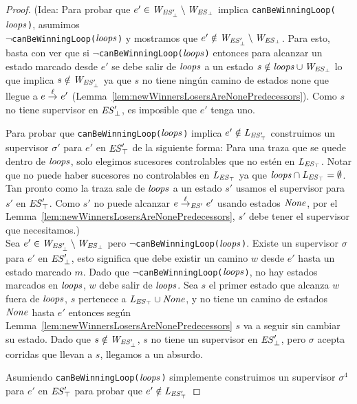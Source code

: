 \begin{proof}
	(Idea: Para probar que $e' \in \mathit{W_{\mathit{\mathit{ES}'_{\bot}}}} \setminus \mathit{W_{\mathit{\mathit{ES}_{\bot}}}}$ implica \texttt{canBeWinningLoop($\mathit{loops}$)}, asumimos \\ $\neg$\texttt{canBeWinningLoop($\mathit{loops}$)} y mostramos que $e' \notin \mathit{W_{\mathit{\mathit{ES}'_{\bot}}}} 
	\setminus \mathit{W_{\mathit{\mathit{ES}_{\bot}}}}$. Para esto, basta con ver que si
	$\neg$\texttt{canBeWinningLoop($\mathit{loops}$)} entonces para alcanzar un estado marcado desde $e'$ se debe salir de $\mathit{loops}$ a un estado $s \notin \mathit{loops} \cup \mathit{W_{\mathit{\mathit{ES}_{\bot}}}}$ lo que implica $s \notin \mathit{W_{\mathit{\mathit{ES}'_{\bot}}}}$ 
	ya que $s$ no tiene ningún camino de estados none que llegue a $e \overset{\ell}{\rightarrow}_{} e'$  (Lemma~\ref{lem:newWinnersLosersAreNonePredecessors}).
	Como $s$ no tiene supervisor en $\mathit{\mathit{ES}'_{\bot}}$, es imposible que $e'$ tenga uno. 
	
	Para probar que \texttt{canBeWinningLoop($\mathit{loops}$)} implica $e' \notin \mathit{L_{\mathit{\mathit{ES}'_{\top}}}}$ construimos un supervisor $\sigma'$ para $e'$ en $\mathit{\mathit{ES}'_{\top}}$ de la siguiente forma:
	Para una traza que se quede dentro de $\mathit{loops}$, solo elegimos sucesores controlables que no estén en $\mathit{L_{\mathit{\mathit{ES}_{\top}}}}$. Notar que no puede haber sucesores no controlables en $\mathit{L_{\mathit{\mathit{ES}_{\top}}}}$ ya que
	$\mathit{loops} \cap \mathit{L_{\mathit{\mathit{ES}_{\top}}}}= \emptyset$. Tan pronto como la traza sale de $\mathit{loops}$ a un estado $s'$ usamos el supervisor para $s'$ en $\mathit{\mathit{ES}'_{\top}}$. 
	Como $s'$ no puede alcanzar $e \overset{\ell}{\rightarrow}_{\mathit{ES}'} 
	e'$ usando estados $\mathit{None}$, por el 
	Lemma~\ref{lem:newWinnersLosersAreNonePredecessors}, $s'$ debe tener el supervisor que necesitamos.)	\\


Sea $e' \in \mathit{W_{\mathit{\mathit{ES}'_{\bot}}}} \setminus \mathit{W_{\mathit{\mathit{ES}_{\bot}}}}$ pero $\neg$\texttt{canBeWinningLoop($\mathit{loops}$)}.
Existe un supervisor $\sigma$ para $e'$ en $\mathit{\mathit{ES}'_{\bot}}$, esto significa que debe existir un camino $w$ desde $e'$ hasta un estado marcado $m$. 
Dado que $\neg$\texttt{canBeWinningLoop($\mathit{loops}$)}, no hay estados marcados en $\mathit{loops}$, $w$ debe salir de $\mathit{loops}$. 
Sea $s$ el primer estado que alcanza $w$ fuera de $\mathit{loops}$, $s$ pertenece a $\mathit{L_{\mathit{\mathit{ES}_{\top}}}} \cup \mathit{None}$, y no tiene un camino de estados $\mathit{None}$ hasta $e'$ entonces según Lemma~\ref{lem:newWinnersLosersAreNonePredecessors} $s$ va a seguir sin cambiar su estado.
Dado que $s \notin \mathit{W_{\mathit{\mathit{ES}'_{\bot}}}}$, $s$ no tiene un supervisor en $\mathit{\mathit{ES}'_{\bot}}$, pero $\sigma$ acepta corridas que llevan a $s$, llegamos a un absurdo.

Asumiendo \texttt{canBeWinningLoop($\mathit{loops}$)} simplemente construimos un supervisor $\sigma^4$ para $e'$ en $\mathit{\mathit{ES}'_{\top}}$ para probar que $e' \notin \mathit{L_{\mathit{\mathit{ES}'_{\top}}}}$


\end{proof}
